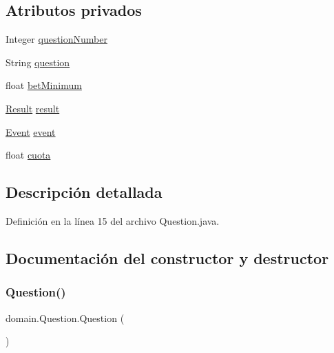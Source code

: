 \subsection*{Atributos privados}
\begin{DoxyCompactItemize}
\item 
Integer \mbox{\hyperlink{classdomain_1_1Question_a0570239b13202e004eef891b49db538e}{question\+Number}}
\item 
String \mbox{\hyperlink{classdomain_1_1Question_a3f1c6038e83e09658df60eed71e5deb4}{question}}
\item 
float \mbox{\hyperlink{classdomain_1_1Question_a24ff305bdbaca1ac5ea5263f8f9be7d2}{bet\+Minimum}}
\item 
\mbox{\hyperlink{classdomain_1_1Result}{Result}} \mbox{\hyperlink{classdomain_1_1Question_a74d098c940c1c91c8f37fd9288ebd3d3}{result}}
\item 
\mbox{\hyperlink{classdomain_1_1Event}{Event}} \mbox{\hyperlink{classdomain_1_1Question_a375d8735a06d8a8b12fe643bb31f4c14}{event}}
\item 
float \mbox{\hyperlink{classdomain_1_1Question_a532249286ab9f5f211a030892bcd6756}{cuota}}
\end{DoxyCompactItemize}


\subsection{Descripción detallada}


Definición en la línea 15 del archivo Question.\+java.



\subsection{Documentación del constructor y destructor}
\mbox{\label{classdomain_1_1Question_ad025aa3764e207e64c6f5b5e09976af3}} 
\subsubsection{\texorpdfstring{Question()}{Question()}\hspace{0.1cm}{\footnotesize\ttfamily [1/5]}}
{\footnotesize\ttfamily domain.\+Question.\+Question (\begin{DoxyParamCaption}{ }\end{DoxyParamCaption})}



